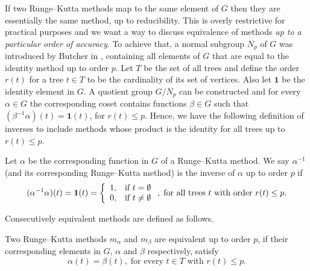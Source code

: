 \indent If two Runge--Kutta methods map to the same element of $G$ then they are essentially the same method, up to reducibility. This is overly restrictive for practical purposes and we want a way to discuss equivalence of methods \emph{up to a particular order of accuracy}. To achieve that, a normal subgroup $N_p$ of $G$ was introduced by Butcher in \cite{Butcher2008_book}, containing all elements of $G$ that are equal to the identity method up to order $p$. Let $T$ be the set of all trees and define the order $r(t)$ for a  tree $t \in T$ to be the cardinality of its set of vertices. Also let $\bm{1}$ be the identity element in $G$. A quotient group $G/N_p$ can be constructed and for every $\alpha \in G$ the corresponding coset contains functions $\beta \in G$ such that $(\beta^{-1}\alpha)(t) = \bm{1}(t)$, for $r(t) \leq p$. Hence, we have the following definition of inverses to include methods whose product is the identity for all trees up to $r(t) \leq p$.
\begin{definition}\label{def:Inverse_up_to_p}
	Let $\alpha$ be the corresponding function in $G$ of a Runge--Kutta method. We say $\alpha^{-1}$ (and its corresponding
  Runge--Kutta method) is the inverse of $\alpha$ up to order $p$ if
  \begin{displaymath}
		(\alpha^{-1}\alpha)(t) = \bm{1}(t) = \left\{
  															\begin{array}{l l}
  																1, & \text{if $t = \emptyset$}\\
   																0, & \text{if $t \neq \emptyset$}
  															\end{array} \right., 
  		\; \text{for all trees $t$ with order $r(t) \leq p$.}
  	\end{displaymath}
\end{definition}
\noindent Consecutively equivalent methods are defined as follows.
\begin{definition}\label{def:Equivalent_methods}
	Two Runge--Kutta methods $m_\alpha$ and $m_\beta$ are equivalent up to order $p$, if their corresponding elements in $G$, $\alpha$ and $\beta$ respectively, satisfy
	\begin{displaymath}
		\alpha(t) = \beta(t), \; \text{for every $t \in T$ with $r(t) \leq p$}.
	\end{displaymath}
\end{definition}
